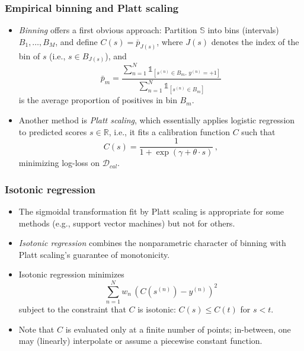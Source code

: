 \begin{frame}[t]
	\frametitle{Empirical binning and Platt scaling}
	
	\begin{itemize}
		\item \emph{Binning} offers a first obvious approach: %
		Partition $\mathbb{S}$ into bins (intervals) $B_1, \ldots , B_M$, and define 
		$C(s) = \bar{p}_{J(s)}$, 
		where $J(s)$ denotes the index of the bin of $s$ (i.e., $s \in B_{J(s)}$), and 
		$$
		\bar{p}_m = \frac{\sum_{n=1}^N \mathds{1}_{[ s^{(n)} \in B_m  , \, y^{(n)} = +1  ]} }{\sum_{n=1}^N \mathds{1}_{[ s^{(n)} \in B_m  ]} } 
		$$
		is the average proportion of positives in bin $B_m$.
		
		\item Another method is \emph{Platt scaling}, which essentially applies logistic regression to predicted scores $s \in \mathbb{R}$, i.e., it fits a calibration function $C$ such that
		$$
		C(s) = \frac{1}{1 + \exp( \gamma + \theta \cdot s) } \, ,
		$$
		minimizing log-loss on $\mathcal{D}_{cal}$.
	\end{itemize}
\end{frame}






\begin{frame}[t]
	\frametitle{Isotonic regression}
	
	\begin{itemize}
		\item The sigmoidal transformation fit by Platt scaling is appropriate for some methods (e.g., support vector machines) but not for others. 
		\item \emph{Isotonic regression} combines the nonparametric character of binning with Platt scaling's guarantee of monotonicity.
		\item Isotonic regression minimizes 
		$$
		\sum_{n=1}^N w_n \, (C(s^{(n)}) - y^{(n)})^2 
		$$
		subject to the constraint that $C$ is isotonic: $C(s) \leq C(t)$ for $s <t$. 
		\item 
		Note that $C$ is evaluated only at a finite number of points; in-between, one may (linearly) interpolate or assume a piecewise constant function. 
		
	\end{itemize}
\end{frame}


